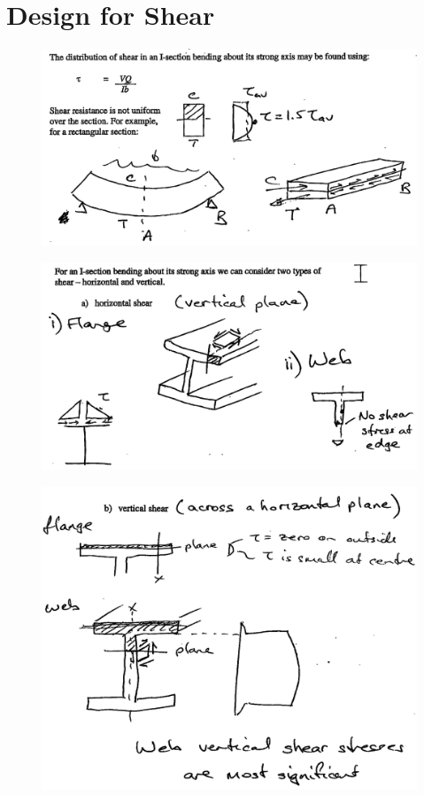 \section{Design for Shear}
\begin{figure}[H]
\centering
\includegraphics[width=.9\textwidth]{PIC/CH05/OSHEAR1}
\end{figure}
\begin{figure}[H]
\centering
\includegraphics[width=.9\textwidth]{PIC/CH05/OSHEAR2}
\end{figure}
\begin{figure}[H]
\centering
\includegraphics[width=.9\textwidth]{PIC/CH05/OSHEAR3}
\end{figure}
